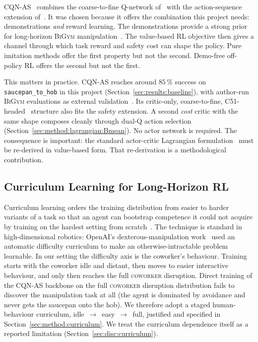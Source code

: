 \documentclass[11pt,a4paper]{report}
\newcommand{\bigym}{\textsc{BiGym}}
\newcommand{\cqnas}{CQN-AS}
\newcommand{\coworker}{\textsc{coworker}}
\begin{document}
\cqnas{}~\cite{seo2024cqnas,seo2025actionsequence} combines the
coarse-to-fine Q-network of~\cite{seo2024cqnas} with the
action-sequence extension of~\cite{seo2025actionsequence}. It was
chosen because it offers the combination this project needs:
demonstrations \emph{and} reward learning. The demonstrations provide
a strong prior for long-horizon \bigym{}
manipulation~\cite{chernyadev2024bigym}. The value-based RL objective
then gives a channel through which task reward and safety cost can
shape the policy. Pure imitation methods offer the first property but
not the second. Demo-free off-policy RL offers the second but not the
first.

This matters in practice. \cqnas{} reaches around $85\,\%$ success on
\texttt{saucepan\_to\_hob} in this project
(Section~\ref{sec:results:baseline}), with author-run \bigym{}
evaluations as external validation~\cite{seo2024cqnas,chernyadev2024bigym}.
Its critic-only, coarse-to-fine, C51-headed~\cite{bellemare2017c51}
structure also fits the safety extension. A second \emph{cost} critic
with the same shape composes cleanly through dual-Q action selection
(Section~\ref{sec:method:lagrangian:Bmean}). No actor network is
required. The consequence is important: the standard actor-critic
Lagrangian formulation~\cite{ray2019safetygym,stooke2020pid} must be
re-derived in value-based form. That re-derivation is a methodological
contribution.

\subsection{Curriculum Learning for Long-Horizon RL}
\label{sec:bg:rl:curriculum}

Curriculum learning orders the training distribution from easier to
harder variants of a task so that an agent can bootstrap competence
it could not acquire by training on the hardest setting from
scratch~\cite{narvekar2020curriculum}. The technique is standard in
high-dimensional robotics: OpenAI's dexterous-manipulation
work~\cite{openai2019solving} used an automatic difficulty
curriculum to make an otherwise-intractable problem learnable. In
our setting the difficulty axis is the coworker's behaviour. Training
starts with the coworker idle and distant, then moves to easier
interactive behaviour, and only then reaches the full \coworker{}
disruption. Direct training of the
\cqnas{} backbone on the full
\coworker{} disruption distribution fails to discover the
manipulation task at all (the agent is dominated by avoidance and
never gets the saucepan onto the hob). We therefore adopt a staged
human-behaviour curriculum,
idle~$\rightarrow$~easy~$\rightarrow$~full, justified and specified in
Section~\ref{sec:method:curriculum}. We treat the curriculum
dependence itself as a reported limitation
(Section~\ref{sec:disc:curriculum}).
\end{document}
